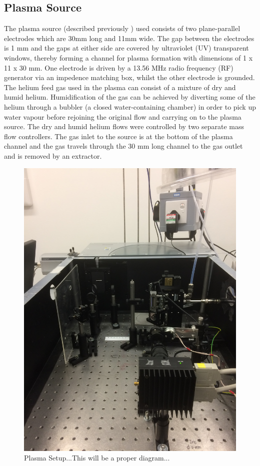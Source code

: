 \documentclass[11pt, oneside]{article}   	%
\begin{document}
\subsection{Plasma Source}
The plasma source (described previously \cite{Niemi2013}) used consists of two plane-parallel electrodes which are 30mm long and 11mm wide. 
The gap between the electrodes is 1 mm and the gaps at either side are covered by ultraviolet (UV) transparent windows, thereby forming a channel for plasma formation with dimensions of 1 x 11 x 30 mm.
One electrode is driven by a 13.56 MHz radio frequency (RF) generator via an impedence matching box, whilst the other electrode is grounded. 
The helium feed gas used in the plasma can consist of a mixture of dry and humid helium. Humidification of the gas can be achieved by diverting some of the helium through a bubbler (a closed water-containing chamber) in order to pick up water vapour before rejoining the original flow and carrying on to the plasma source.
The dry and humid helium flows were controlled by two separate mass flow controllers.
The gas inlet to the source is at the bottom of the plasma channel and the gas travels through the 30 mm long channel to the gas outlet and is removed by an extractor.




\begin{figure}
    \centering
    \includegraphics[width=\textwidth]{Figures/PlasmaSetup.JPG}
    \caption{Plasma Setup...This will be a proper diagram...}
    \label{fig:my_label}
\end{figure}
\end{document}
